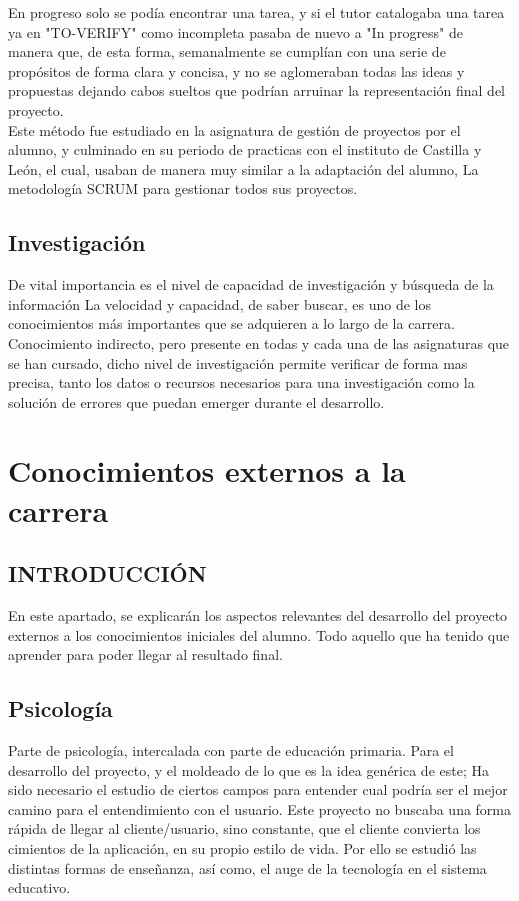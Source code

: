 En progreso solo se podía encontrar una tarea, y si el tutor catalogaba una tarea ya en "TO-VERIFY" como incompleta pasaba de nuevo a "In progress" de manera que, de esta forma, semanalmente se cumplían con una serie de propósitos de forma clara y concisa, y no se aglomeraban todas las ideas y propuestas dejando  cabos sueltos que podrían arruinar la representación final del proyecto. \\
Este método fue estudiado en la asignatura de gestión de proyectos por el alumno, y culminado en su periodo de practicas con el instituto de Castilla y León, el cual, usaban de manera muy similar a la adaptación del alumno, La metodología SCRUM para gestionar todos sus proyectos.\\

\subsection{Investigación}
De vital importancia es el nivel de capacidad de investigación y búsqueda de la información La velocidad y capacidad, de saber buscar, es uno de los conocimientos más importantes que se adquieren a lo largo de la carrera. Conocimiento indirecto, pero presente en todas y cada una de las asignaturas que se han cursado, dicho nivel de investigación permite verificar de forma mas precisa, tanto  los datos o recursos necesarios para una investigación como la solución de errores que puedan emerger durante el desarrollo.
\section{Conocimientos externos a la carrera}
\subsection{INTRODUCCIÓN}
En este apartado, se explicarán los aspectos relevantes del desarrollo del proyecto externos a los conocimientos iniciales del alumno. Todo aquello que ha tenido que aprender para poder llegar al resultado final.
\subsection{Psicología}
Parte de psicología, intercalada con  parte de educación primaria. Para el desarrollo del proyecto, y el moldeado de lo que es la idea genérica de este; Ha sido necesario el estudio de ciertos campos para entender cual podría ser el mejor camino para el entendimiento con el usuario. Este proyecto no buscaba una forma rápida de llegar al cliente/usuario, sino constante, que el cliente convierta los cimientos de la aplicación, en su propio estilo de vida. Por ello se estudió las distintas formas de enseñanza, así como, el auge de la tecnología en el sistema educativo.
